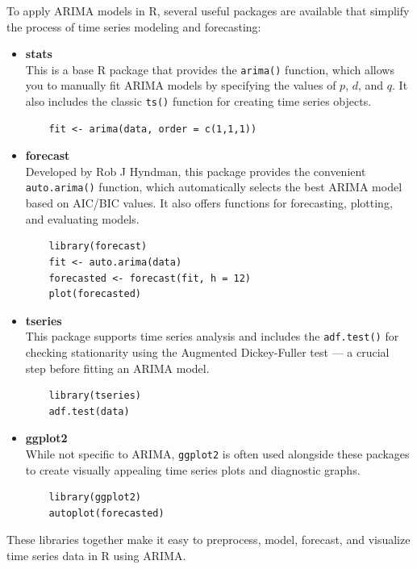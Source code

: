 To apply ARIMA models in R, several useful packages are available that simplify the process of time series modeling and forecasting:
\begin{itemize}
    \item \textbf{stats} \\
    This is a base R package that provides the \texttt{arima()} function, which allows you to manually fit ARIMA models by specifying the values of \(p\), \(d\), and \(q\). It also includes the classic \texttt{ts()} function for creating time series objects.
    \begin{verbatim}
    fit <- arima(data, order = c(1,1,1))
    \end{verbatim}
    
    \item \textbf{forecast} \\
    Developed by Rob J Hyndman, this package provides the convenient \texttt{auto.arima()} function, which automatically selects the best ARIMA model based on AIC/BIC values. It also offers functions for forecasting, plotting, and evaluating models.
    \begin{verbatim}
    library(forecast)
    fit <- auto.arima(data)
    forecasted <- forecast(fit, h = 12)
    plot(forecasted)
    \end{verbatim}
    
    \item \textbf{tseries} \\
    This package supports time series analysis and includes the \texttt{adf.test()} for checking stationarity using the Augmented Dickey-Fuller test — a crucial step before fitting an ARIMA model.
    \begin{verbatim}
    library(tseries)
    adf.test(data)
    \end{verbatim}
    
    \item \textbf{ggplot2} \\
    While not specific to ARIMA, \texttt{ggplot2} is often used alongside these packages to create visually appealing time series plots and diagnostic graphs.
    \begin{verbatim}
    library(ggplot2)
    autoplot(forecasted)
    \end{verbatim}
\end{itemize}

These libraries together make it easy to preprocess, model, forecast, and visualize time series data in R using ARIMA.

